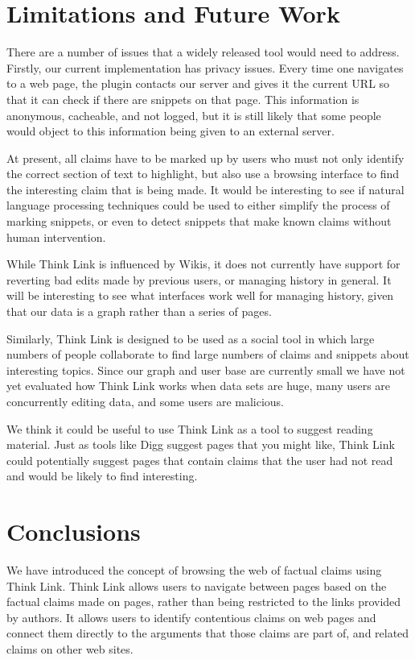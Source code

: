 \documentclass{chi2009}
\begin{document}
\section{Limitations and Future Work}

There are a number of issues that a widely released tool would need to address. Firstly, our current implementation has privacy issues. Every time one navigates to a web page, the plugin contacts our server and gives it the current URL so that it can check if there are snippets on that page. This information is anonymous, cacheable, and not logged, but it is still likely that some people would object to this information being given to an external server. 

At present, all claims have to be marked up by users who must not only identify the correct section of text to highlight, but also use a browsing interface to find the interesting claim that is being made. It would be interesting to see if natural language processing techniques could be used to either simplify the process of marking snippets, or even to detect snippets that make known claims without human intervention.

While Think Link is influenced by Wikis, it does not currently have support for reverting bad edits made by previous users, or managing history in general. It will be interesting to see what interfaces work well for managing history, given that our data is a graph rather than a series of pages.

Similarly, Think Link is designed to be used as a social tool in which large numbers of people collaborate to find large numbers of claims and snippets about interesting topics. Since our graph and user base are currently small we have not yet evaluated how Think Link works when data sets are huge, many users are concurrently editing data, and some users are malicious.

We think it could be useful to use Think Link as a tool to suggest reading material. Just as tools like Digg suggest pages that you might like, Think Link could potentially suggest pages that contain claims that the user had not read and would be likely to find interesting.


\section{Conclusions}

We have introduced the concept of browsing the web of factual claims using Think Link. Think Link allows users to navigate between pages based on the factual claims made on pages, rather than being restricted to the links provided by authors. It allows users to identify contentious claims on web pages and connect them directly to the arguments that those claims are part of, and related claims on other web sites.
\end{document}

